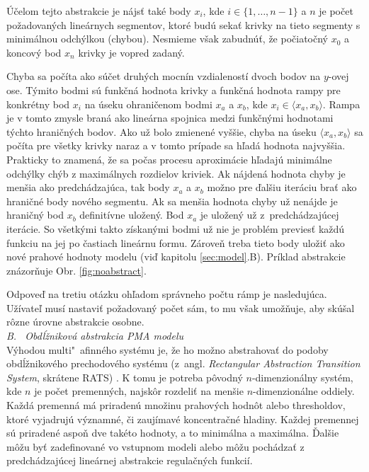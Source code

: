 \documentclass[11pt,final,oneside]{fithesis}
\begin{document}
\' U\v celom tejto abstrakcie je n\'ajs\v t tak\'e body $x_i$, kde $i \in \{1,\dots{},n-1\}$ a $n$ je po\v cet po\v zadovan\'ych line\'arnych segmentov, 
ktor\'e bud\'u 
seka\v t krivky na tieto segmenty s minim\'alnou odch\'ylkou (chybou). Nesmieme v\v sak zabudn\'u\v t, \v ze po\v ciato\v cn\'y $x_0$ a koncov\'y bod $x_n$ 
krivky je vopred zadan\'y. 

Chyba sa po\v c\'ita ako s\'u\v cet druh\'ych mocn\'in vzdialenost\'i dvoch 
bodov na $y$-ovej ose. T\'ymito bodmi s\'u funk\v cn\'a hodnota krivky a funk\v cn\'a hodnota rampy pre konkr\'etny bod $x_i$ na \'useku ohrani\v cenom bodmi 
$x_a$ a $x_b$, kde $x_i \in \langle x_a,x_b\rangle$. Rampa je v tomto zmysle bran\'a ako line\'arna spojnica medzi funk\v cn\'ymi hodnotami t\'ychto
hrani\v cn\'ych bodov. Ako u\v z bolo zmienen\'e vy\v s\v sie, chyba na \'useku $\langle x_a,x_b\rangle$ sa po\v c\'ita pre v\v setky krivky naraz a v tomto 
pr\'ipade sa h\v lad\'a hodnota najvy\v s\v sia. Prakticky to znamen\'a, \v ze sa po\v cas procesu aproxim\'acie h\v ladaj\'u minim\'alne odch\'ylky ch\'yb z 
maxim\'alnych rozdielov kriviek. 
Ak n\'ajden\'a hodnota chyby je men\v sia ako predch\'adzaj\'uca, tak body $x_a$ a $x_b$ mo\v zno pre \v dal\v siu iter\'aciu bra\v t ako hrani\v cn\'e body 
nov\'eho segmentu. Ak sa men\v sia hodnota chyby u\v z nen\'ajde je hrani\v cn\'y bod $x_b$ definit\'ivne ulo\v zen\'y. Bod $x_a$ je ulo\v zen\'y u\v z 
z~predch\'adzaj\'ucej iter\'acie.
So v\v setk\'ymi takto z\'iskan\'ymi bodmi u\v z nie je probl\'em previes\v t ka\v zd\'u funkciu na jej po \v castiach 
line\'arnu formu. Z\'arove\v n treba tieto body ulo\v zi\v t ako nov\'e prahov\'e hodnoty modelu (vi\v d kapitolu \ref{sec:model}.B). 
Pr\'iklad abstrakcie zn\'azor\v nuje Obr. \ref{fig:noabstract}.

Odpove\v d na tretiu ot\'azku oh\v ladom spr\'avneho po\v ctu r\'amp je nasleduj\'uca.
U\v z\'ivate\v l mus\'i nastavi\v t po\v zadovan\'y po\v cet s\'am, to mu v\v sak umo\v z\v nuje, aby sk\'u\v sal r\^ ozne \'urovne abstrakcie osobne.
\cite{CAV-2011}
\\

\noindent
\textit{B. \ Obd\'l\v znikov\'a abstrakcia PMA modelu}
\\

V\'yhodou multi"~afinn\'eho syst\'emu je, \v ze ho mo\v zno abstrahova\v t do podoby obd\'l\v znikov\'eho prechodov\'eho syst\'emu (z~angl. \textit{
Rectangular Abstraction Transition System}, skr\'atene RATS) \cite{RATS}. K tomu je potreba p\^ ovodn\'y $n$-dimenzion\'alny syst\'em, kde $n$ je po\v cet 
premenn\'ych, najsk\^ or rozdeli\v t na men\v sie $n$-dimenzion\'alne oddiely. Ka\v zd\'a premenn\'a m\'a priraden\'u mno\v zinu prahov\'ych hodn\^ ot alebo
thresholdov, ktor\'e vyjadruj\'u v\'yznamn\'e, \v ci zauj\'imav\'e koncentra\v cn\'e hladiny. Ka\v zdej premennej s\'u priraden\'e aspo\v n dve tak\'eto 
hodnoty, a to minim\'alna a maxim\'alna. \v Dal\v sie m\^ o\v zu by\v t zadefinovan\'e vo vstupnom modeli alebo m\^ o\v zu poch\'adza\v t z predch\'adzaj\'ucej
line\'arnej abstrakcie regula\v cn\'ych funkci\'i.
\end{document}
